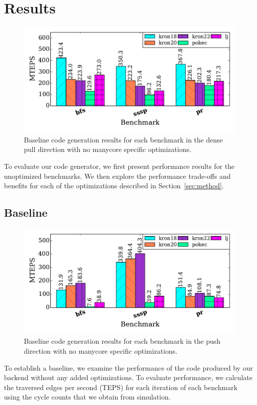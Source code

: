 \section{Results}
\begin{figure}[t]
    \centering
    \includegraphics[scale = 0.5]{graphit-figures/baseline.pdf}
    \caption{Baseline code generation results for each benchmark in the dense pull direction with no manycore specific optimizations.}
    \label{pap:generals:sec:eval:fig:baseline}
\end{figure}

To evaluate our code generator, we first present performance results for the unoptimized benchmarks. 
We then explore the performance trade-offs and benefits for each of the optimizations described in Section~\ref{sec:method}.

\subsection{Baseline}
 
\begin{figure}[t]
    \centering
    \includegraphics[scale = 0.5]{graphit-figures/push.pdf}
    \caption{Baseline code generation results for each benchmark in the push direction with no manycore specific optimizations.}
    \label{pap:generals:sec:eval:fig:push}
\end{figure}
To establish a baseline, we examine the performance of the code produced by our backend without any added optimizations.
To evaluate performance, we calculate the traversed edges per second (TEPS) for each iteration of each benchmark using the cycle counts that we obtain from simulation.

